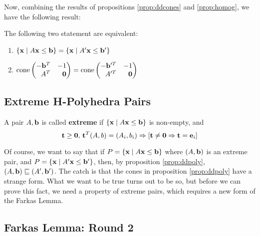 Now, combining the results of propositions \ref{prop:ddcones} and \ref{prop:homog}, we have the following result:

\begin{Prop}{\label{prop:ddpoly}
  The following two statement are equivalent:
\begin{enumerate}
  \item $\left\{\mathbf{x}\;|\; A\mathbf{x}\leq \mathbf{b}\right\} = \left\{\mathbf{x}\;|\; A'\mathbf{x}\leq \mathbf{b}'\right\}$
  \item $\cone \pmb -\b^T & -1 \\ A^T & \0 \pme = \cone \pmb -\b'^T & -1 \\ A'^T & \0 \pme$
\end{enumerate}
}\end{Prop}

\subsection{Extreme H-Polyhedra Pairs}
\begin{Def}{
  A pair $A,\mathbf{b}$ is called \textbf{extreme} if $\left\{\mathbf{x}\;|\; A\mathbf{x}\leq \mathbf{b}\right\}$ is non-empty, and
  \[ \mathbf{t} \geq \mathbf{0},\, \mathbf{t}^T(A,b) = (A_i,b_i) \Rightarrow [\mathbf{t} \neq \mathbf{0} \Rightarrow \mathbf{t} = \mathbf{e}_i] \]
}\end{Def}

Of course, we want to say that if $P = \left\{\mathbf{x}\;|\; A\mathbf{x}\leq \mathbf{b}\right\}$ where $(A,\mathbf{b})$ is an extreme pair, and $P = \left\{\mathbf{x}\;|\; A'\mathbf{x}\leq \mathbf{b}'\right\}$, then, by proposition \ref{prop:ddpoly}, $(A,\mathbf{b}) \sqsubseteq (A',\mathbf{b}')$.  The catch is that the cones in proposition \ref{prop:ddpoly} have a strange form.  What we want to be true turns out to be so, but before we can prove this fact, we need a property of extreme pairs, which requires a new form of the Farkas Lemma.

\subsection{Farkas Lemma: Round 2}

